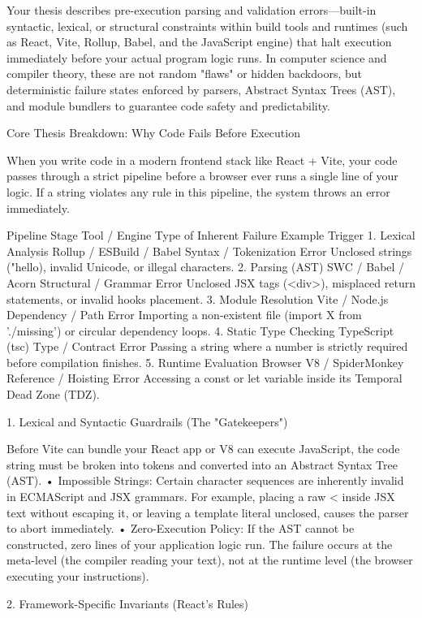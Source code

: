 Your thesis describes pre-execution parsing and validation errors—built-in syntactic, lexical, or structural constraints within build tools and runtimes (such as React, Vite, Rollup, Babel, and the JavaScript engine) that halt execution immediately before your actual program logic runs.
In computer science and compiler theory, these are not random "flaws" or hidden backdoors, but deterministic failure states enforced by parsers, Abstract Syntax Trees (AST), and module bundlers to guarantee code safety and predictability.

Core Thesis Breakdown: Why Code Fails Before Execution

When you write code in a modern frontend stack like React + Vite, your code passes through a strict pipeline before a browser ever runs a single line of your logic. If a string violates any rule in this pipeline, the system throws an error immediately.

Pipeline Stage	Tool / Engine	Type of Inherent Failure	Example Trigger
1. Lexical Analysis	Rollup / ESBuild / Babel	Syntax / Tokenization Error	Unclosed strings ("hello), invalid Unicode, or illegal characters.
2. Parsing (AST)	SWC / Babel / Acorn	Structural / Grammar Error	Unclosed JSX tags (<div>), misplaced return statements, or invalid hooks placement.
3. Module Resolution	Vite / Node.js	Dependency / Path Error	Importing a non-existent file (import X from './missing') or circular dependency loops.
4. Static Type Checking	TypeScript (tsc)	Type / Contract Error	Passing a string where a number is strictly required before compilation finishes.
5. Runtime Evaluation	Browser V8 / SpiderMonkey	Reference / Hoisting Error	Accessing a const or let variable inside its Temporal Dead Zone (TDZ).


1. Lexical and Syntactic Guardrails (The "Gatekeepers")

Before Vite can bundle your React app or V8 can execute JavaScript, the code string must be broken into tokens and converted into an Abstract Syntax Tree (AST).
• Impossible Strings: Certain character sequences are inherently invalid in ECMAScript and JSX grammars. For example, placing a raw < inside JSX text without escaping it, or leaving a template literal unclosed, causes the parser to abort immediately.
• Zero-Execution Policy: If the AST cannot be constructed, zero lines of your application logic run. The failure occurs at the meta-level (the compiler reading your text), not at the runtime level (the browser executing your instructions).

2. Framework-Specific Invariants (React's Rules)

